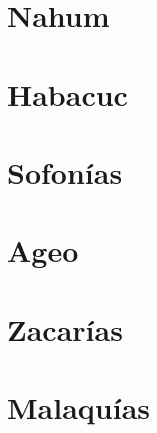 \chapter{Nahum}



\chapter{Habacuc}



\chapter{Sofonías}



\chapter{Ageo}



\chapter{Zacarías}



\chapter{Malaquías}



\newpage

\pagestyle{empty}

